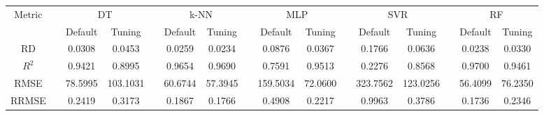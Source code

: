 \begin{table}[!htbp]
	\setlength{\tabcolsep}{3pt}
	\begin{tabular}{cccccccccccccccc}
		\toprule
		\multirow{2}{*}{Metric} & & \multicolumn{2}{c}{DT} & & \multicolumn{2}{c}{k-NN} & & \multicolumn{2}{c}{MLP} & & \multicolumn{2}{c}{SVR} & & \multicolumn{2}{c}{RF}\\
		 \cline{3-4} \cline{6-7} \cline{9-10} \cline{12-13} \cline{15-16}
		  & & Default & Tuning & & Default & Tuning & & Default & Tuning & & Default & Tuning & & Default & Tuning\\
		\midrule
		RD & & 0.0308 & 0.0453 & & 0.0259 & 0.0234 & & 0.0876 & 0.0367 & & 0.1766 & 0.0636 & & 0.0238 & 0.0330\\
		$R^2$ & & 0.9421 & 0.8995 & & 0.9654 & 0.9690 & & 0.7591 & 0.9513 & & 0.2276 & 0.8568 & & 0.9700 & 0.9461\\
		RMSE & & 78.5995 & 103.1031 & & 60.6744 & 57.3945 & & 159.5034 & 72.0600 & & 323.7562 & 123.0256 & & 56.4099 & 76.2350\\
		RRMSE & & 0.2419 & 0.3173 & & 0.1867 & 0.1766 & & 0.4908 & 0.2217 & & 0.9963 & 0.3786 & & 0.1736 & 0.2346\\
		\bottomrule
	\end{tabular}
\end{table}
